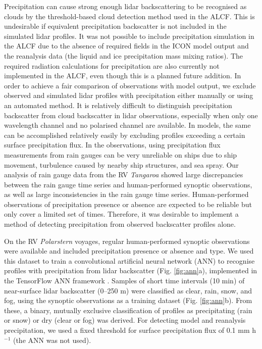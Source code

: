\documentclass[draft]{agujournal2019}
\begin{document}
Precipitation can cause strong enough lidar backscattering to be recognised as
clouds by the threshold-based cloud detection method used in the ALCF. This is
undesirable if equivalent precipitation backscatter is not included in the
simulated lidar profiles. It was not possible to include precipitation
simulation in the ALCF due to the absence of required fields in the ICON model
output and the reanalysis data (the liquid and ice precipitation mass mixing
ratios). The required radiation calculations for precipitation are also
currently not implemented in the ALCF, even though this is a planned future
addition.  In order to achieve a fair comparison of observations with model
output, we exclude observed and simulated lidar profiles with precipitation
either manually or using an automated method. It is relatively difficult to
distinguish precipitation backscatter from cloud backscatter in lidar
observations, especially when only one wavelength channel and no polarised
channel are available. In models, the same can be accomplished relatively
easily by excluding profiles exceeding a certain surface precipitation flux. In
the observations, using precipitation flux measurements from rain gauges can be
very unreliable on ships due to ship movement, turbulence caused by nearby ship
structures, and sea spray. Our analysis of rain gauge data from the RV
\emph{Tangaroa} showed large discrepancies between the rain gauge time series
and human-performed synoptic observations, as well as large inconsistencies in
the rain gauge time series. Human-performed observations of precipitation
presence or absence are expected to be reliable but only cover a limited set of
times. Therefore, it was desirable to implement a method of detecting
precipitation from observed backscatter profiles alone.

On the RV \emph{Polarstern} voyages, regular human-performed synoptic
observations were available and included precipitation presence or absence and
type. We used this dataset to train a convolutional artificial neural network
(ANN) to recognise profiles with precipitation from lidar backscatter (Fig.
\ref{fig:ann}a), implemented in the TensorFlow ANN framework
. Samples of short time intervals (10 min) of near-surface
lidar backscatter (0–250 m) were classified as clear, rain, snow, and fog,
using the synoptic observations as a training dataset (Fig.  \ref{fig:ann}b).
From these, a binary, mutually exclusive classification of profiles as
precipitating (rain or snow) or dry (clear or fog) was derived.  For detecting
model and reanalysis precipitation, we used a fixed threshold for surface
precipitation flux of 0.1 mm h$^{-1}$ (the ANN was not used).
\end{document}
